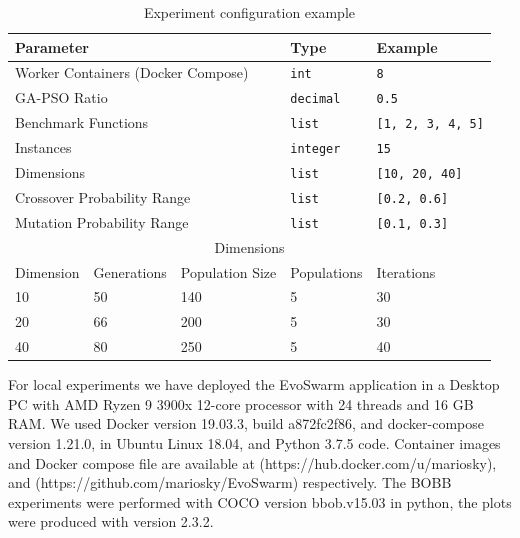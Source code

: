 \documentclass[review]{elsarticle}
\begin{document}
\begin{table}[h!tbp]
    \small
    \caption{ Experiment configuration example 
    }
    \label{tab:params}
    \centering
    \small
    \begin{tabular}{|l|l|l|l|l|}
      \hline
      \multicolumn{3}{|l|}{Parameter}                    & Type             & Example         \\ \hline
      \multicolumn{3}{|l|}{Worker Containers (Docker Compose)}        & \texttt{int}     & \texttt{8} \\ \hline
      \multicolumn{3}{|l|}{GA-PSO Ratio}                 & \texttt{decimal} & \texttt{0.5}    \\  \hline
      \multicolumn{3}{|l|}{Benchmark Functions}          & \texttt{list}    & \texttt{[1, 2, 3, 4, 5]} \\ \hline
      \multicolumn{3}{|l|}{Instances}                    & \texttt{integer}    & \texttt{15} \\ \hline
      \multicolumn{3}{|l|}{Dimensions}                   & \texttt{list}    & \texttt{[10, 20, 40]}        \\ \hline
      \multicolumn{3}{|l|}{Crossover Probability Range}  & \texttt{list}    & \texttt{[0.2, 0.6]}      \\ \hline
      \multicolumn{3}{|l|}{Mutation  Probability Range}  & \texttt{list}    & \texttt{[0.1, 0.3]}      \\ \hline
      \multicolumn{5}{|c|}{Dimensions}                                                      \\ \hline  
      Dimension               & Generations & Population Size & Populations  &     Iterations    \\ \hline
              10              & 50      & 140                 &      5                 & 30                \\ \hline
              20              & 66      & 200                 &      5                 & 30               \\ \hline
              40              & 80      & 250                 &      5                 & 40                \\ \hline
    \end{tabular}
\end{table}

For local experiments we have deployed the EvoSwarm application in a
Desktop PC with AMD Ryzen 9 3900x 12-core processor with 24 threads 
and 16 GB RAM. We used Docker version 19.03.3, build a872fc2f86, and docker-compose version 1.21.0, 
in Ubuntu Linux 18.04, and Python 3.7.5 code. Container images and Docker compose file are available at
(https://hub.docker.com/u/mariosky), and (https://github.com/mariosky/EvoSwarm) respectively. 
The BOBB experiments were performed with COCO \cite{hansen2016coco} version bbob.v15.03 in python, 
the plots were produced with version 2.3.2.
\end{document}
